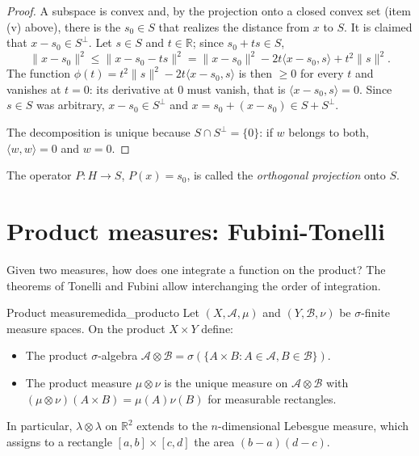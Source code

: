 \documentclass[11pt, a4paper]{article}
\begin{document}
\begin{proof}
A subspace is convex and, by the projection onto a closed convex set (item (v) above),
there is the $s_0 \in S$ that realizes the distance from $x$ to $S$. It is claimed that
$x - s_0 \in S^\perp$. Let $s \in S$ and $t \in \mathbb{R}$; since $s_0 + t s \in S$,
$$ \|x - s_0\|^2 \le \|x - s_0 - t s\|^2 = \|x - s_0\|^2 - 2 t \langle x - s_0, s \rangle +
t^2 \|s\|^2. $$
The function $\phi(t) = t^2 \|s\|^2 - 2 t \langle x - s_0, s \rangle$ is then $\ge 0$ for
every $t$ and vanishes at $t = 0$: its derivative at $0$ must vanish, that is
$\langle x - s_0, s \rangle = 0$. Since $s \in S$ was arbitrary, $x - s_0 \in S^\perp$ and
$x = s_0 + (x - s_0) \in S + S^\perp$.

The decomposition is unique because $S \cap S^\perp = \{0\}$: if $w$ belongs to both,
$\langle w, w \rangle = 0$ and $w = 0$.
\end{proof}

The operator $P: H \to S$, $P(x) = s_0$, is called the \emph{orthogonal projection} onto $S$.

\newpage

\section{Product measures: Fubini-Tonelli}

Given two measures, how does one integrate a function on the product? The theorems of Tonelli and
Fubini allow interchanging the order of integration.

\begin{definicion}{Product measure}{medida_producto}
Let $(X, \mathcal{A}, \mu)$ and $(Y, \mathcal{B}, \nu)$ be $\sigma$-finite measure spaces. On the
product $X \times Y$ define:
\begin{itemize}
    \item The product $\sigma$-algebra $\mathcal{A} \otimes \mathcal{B} = \sigma(\{A \times B :
    A \in \mathcal{A}, B \in \mathcal{B}\})$.
    \item The product measure $\mu \otimes \nu$ is the unique measure on $\mathcal{A} \otimes
    \mathcal{B}$ with $(\mu \otimes \nu)(A \times B) = \mu(A) \nu(B)$ for measurable rectangles.
\end{itemize}
\end{definicion}

\obs In particular, $\lambda \otimes \lambda$ on $\mathbb{R}^2$ extends to the
$n$-dimensional Lebesgue measure, which assigns to a rectangle $[a, b] \times [c, d]$ the area $(b-a)(d-c)$.
\end{document}
